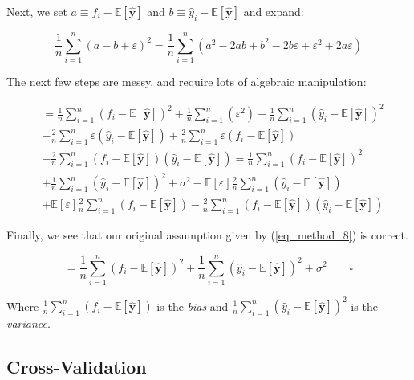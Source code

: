 \documentclass[a4paper,10pt,english]{article}
\begin{document}
Next, we set $a \equiv f_i - \mathbb{E}[\hat{\mathbf{y}}] $ and $b \equiv \hat{y}_i - \mathbb{E}[\hat{\mathbf{y}}]$ and expand:

\begin{equation*}
\frac{1}{n} \sum_{i=1}^{n} (a - b + \varepsilon )^2
= \frac{1}{n} \sum_{i=1}^{n} ( a^2 - 2ab + b^2 - 2b\varepsilon + \varepsilon^2 + 2a\varepsilon )
\end{equation*}

The next few steps are messy, and require lots of algebraic manipulation:	

\begin{align*}	
&= \frac{1}{n} \sum_{i=1}^{n} ( f_i - \mathbb{E}[\hat{\mathbf{y}}] )^2 
+ \frac{1}{n} \sum_{i=1}^{n} ( \varepsilon^2 )
+ \frac{1}{n} \sum_{i=1}^{n} ( \hat{y}_i - \mathbb{E}[\hat{\mathbf{y}}] )^2 
\\&- \frac{2}{n} \sum_{i=1}^{n} \varepsilon ( \hat{y}_i - \mathbb{E}[\hat{\mathbf{y}}] )
+ \frac{2}{n} \sum_{i=1}^{n} \varepsilon ( f_i - \mathbb{E}[\hat{\mathbf{y}}] )
\\&- \frac{2}{n} \sum_{i=1}^{n} ( f_i - \mathbb{E}[\hat{\mathbf{y}}] ) ( \hat{y}_i - \mathbb{E}[\hat{\mathbf{y}}] )
= \frac{1}{n} \sum_{i=1}^{n} ( f_i - \mathbb{E}[\hat{\mathbf{y}}] )^2 
\\&+ \frac{1}{n} \sum_{i=1}^{n} ( \hat{y}_i - \mathbb{E}[\hat{\mathbf{y}}] )^2 
+ \sigma^2
- \mathbb{E}[\varepsilon] \frac{2}{n} \sum_{i=1}^{n} ( \hat{y}_i - \mathbb{E}[\hat{\mathbf{y}}] )
\\&+ \mathbb{E}[\varepsilon] \frac{2}{n} \sum_{i=1}^{n} ( f_i - \mathbb{E}[\hat{\mathbf{y}}] )
-\frac{2}{n} \sum_{i=1}^{n} ( f_i - \mathbb{E}[\hat{\mathbf{y}}] ) ( \hat{y}_i - \mathbb{E}[\hat{\mathbf{y}}] )
\end{align*}

Finally, we see that our original assumption given by (\ref{eq_method_8}) is correct.

\begin{equation*}
= \frac{1}{n} \sum_{i=1}^{n} ( f_i - \mathbb{E}[\hat{\mathbf{y}}] )^2 
+ \frac{1}{n} \sum_{i=1}^{n} ( \hat{y}_i - \mathbb{E}[\hat{\mathbf{y}}] )^2 
+ \sigma^2 \qquad \square
\end{equation*}

Where $\frac{1}{n} \sum_{i=1}^{n} ( f_i - \mathbb{E}[\hat{\mathbf{y}}] )$ is the \textit{bias} and
$\frac{1}{n} \sum_{i=1}^{n} ( \hat{y}_i - \mathbb{E}[\hat{\mathbf{y}}] )^2$ is the \textit{variance}.	

\subsection{Cross-Validation}
\end{document}
